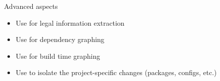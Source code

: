 \setuplabframe
{Advanced aspects}
{
  \begin{itemize}
  \item Use  for legal information extraction
  \item Use  for dependency graphing
  \item Use  for build time graphing
  \item Use  to isolate the project-specific
    changes (packages, configs, etc.)
  \end{itemize}
}
